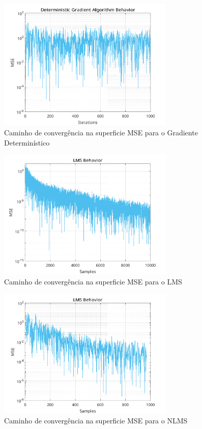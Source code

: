 \documentclass[a4paper,10pt]{article}
\begin{document}
\begin{enumerate}
				\begin{figure}[!ht]
					\centering
					\includegraphics[width=0.75\textwidth]{figs/gradient_mse.png}
					\caption{Caminho de convergência na superficie MSE para o Gradiente Determinístico}
					\label{fig:gradient_mse}
				\end{figure}

				\begin{figure}[!ht]
					\centering
					\includegraphics[width=0.75\textwidth]{figs/lms_mse.png}
					\caption{Caminho de convergência na superficie MSE para o LMS}
					\label{fig:lms_mse}
				\end{figure}

				\begin{figure}[!ht]
					\centering
					\includegraphics[width=0.75\textwidth]{figs/nlms_mse.png}
					\caption{Caminho de convergência na superficie MSE para o NLMS}
					\label{fig:nlms_mse}
				\end{figure}

		\end{enumerate}
	
\end{document}
